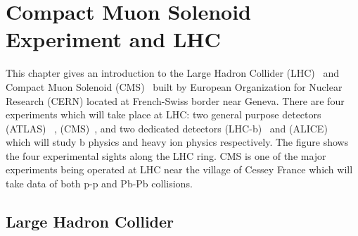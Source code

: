 \def\baselinestretch{1}

\chapter{Compact Muon Solenoid Experiment and LHC }



This chapter gives an introduction to the Large Hadron Collider
(LHC)~\cite{lhc} and Compact Muon Solenoid (CMS)~\cite{cms}
built by European Organization for Nuclear Research (CERN)
located at French-Swiss border near Geneva. There are four
experiments which will take place at LHC: two general purpose
detectors (ATLAS)~\cite{atlas} , (CMS)~\cite{cms}, and two
dedicated detectors (LHC-b)~\cite{lhcb} and (ALICE)~\cite{alice}
which will study b physics and heavy ion physics respectively.
The figure shows the four experimental sights along the LHC
ring. CMS is one of the major experiments being operated at LHC
near the village of Cessey France which will take data of both
p-p and Pb-Pb collisions.

\smallskip

\goodbreak
\section{Large Hadron Collider}

